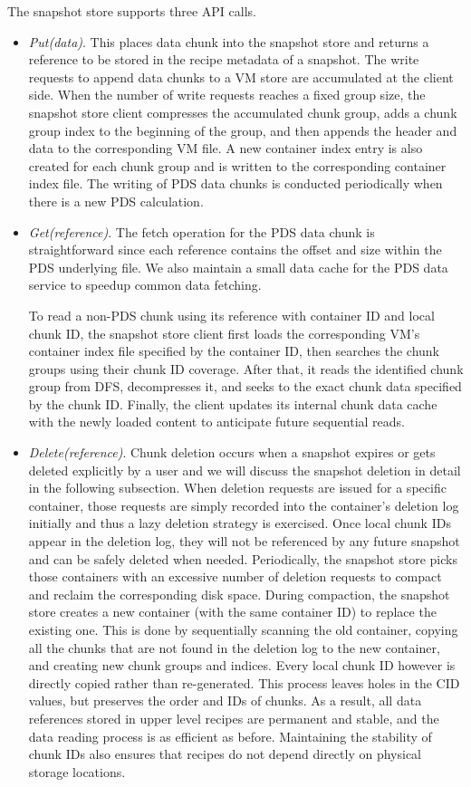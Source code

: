 The snapshot  store supports three API calls.
\begin{itemize}
\item {\em Put(data)}. This places data chunk into the snapshot store and returns a reference to be stored in 
the recipe metadata of a snapshot. 
The write requests to append data chunks to a VM store are accumulated at the client side. 
When the number of write requests reaches a fixed group size, the snapshot store client compresses
the accumulated   chunk group, adds a chunk group index  to the beginning of the group, and then
appends the header and data  to the corresponding VM file.
A new container  index entry is also created for each chunk group and is written to the corresponding
container index file.
The writing of PDS data chunks is conducted periodically when there is a new PDS calculation.
\item{\em Get(reference)}.
The fetch operation for the PDS data chunk is straightforward since each reference contains 
the offset and size within the PDS  underlying  file.
We also maintain a small data cache for the PDS data service to speedup common data fetching.

To read a non-PDS chunk using its reference with container ID and local chunk ID,  the snapshot store client first loads the
corresponding VM's container index file specified by the container ID, then searches the chunk
groups  using their  chunk ID coverage.
After that, it reads the identified chunk group from DFS, decompresses it, and seeks to the exact chunk data 
specified by the chunk ID. 
Finally, the client updates its internal chunk data cache with the newly loaded content to 
anticipate future sequential reads.
\item {\em Delete(reference)}.
Chunk deletion occurs when a snapshot expires or gets deleted explicitly by a user
and we will discuss the snapshot deletion in detail in the following subsection.
When deletion requests are issued for a specific container,
those requests are simply recorded into the  container's deletion log initially and thus  a lazy
deletion strategy is exercised.
Once local chunk IDs appear in
the deletion log, they will not be referenced by any future snapshot and can be safely deleted when needed. 
Periodically, the snapshot  store picks those containers with an excessive
number of deletion requests to  compact and  reclaim the corresponding disk space. 
During compaction, the snapshot store creates a new container (with the same container ID) to replace the 
existing one. This is done by sequentially scanning the old container, copying all the chunks that are not 
found in the deletion log to the new container, and creating new chunk groups and indices. 
Every local chunk ID however is directly copied rather than re-generated. This
process leaves holes in the CID values, but preserves the order and IDs of chunks.
As a result, all data references stored 
in upper level recipes are permanent and stable, and the data reading process
is as efficient as before. Maintaining the stability of chunk IDs also ensures that recipes do not
depend directly on physical storage locations.
\end{itemize}

